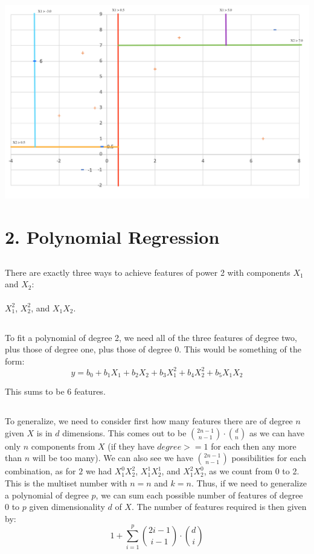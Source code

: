\documentclass[12pt, oneside]{article}   	%
\begin{document}
\includegraphics[scale=0.8]{decisionboundaryplot2}

\section{2. Polynomial Regression}

\subsection{}
There are exactly three ways to achieve features of power 2 with components $X_1$ and $X_2$: \\ \\
$X_1^2$, $X_2^2$, and $X_1X_2$. 

\subsection{}
To fit a polynomial of degree 2, we need all of the three features of degree two, plus those of degree one, plus those of degree 0. This would be something of the form: 
$$y = b_0 + b_1X_1 + b_2X_2 + b_3X_1^2 + b_4X_2^2 + b_5X_1X_2$$

This sums to be 6 features. 

\subsection{}

To generalize, we need to consider first how many features there are of degree $n$ given $X$ is in $d$ dimensions. This comes out to be $\binom{2n-1}{n-1} \cdot \binom{d}{n}$ as we can have only $n$ components from $X$ (if they have $degree >=1$ for each then any more than $n$ will be too many). We can also see we have $\binom{2n-1}{n-1}$ possibilities for each combination, as for $2$ we had $X_1^0X_2^2$, $X_1^1X_2^1$, and $X_1^2X_2^0$, as we count from 0 to 2. This is the multiset number with $n = n$ and $k = n$. Thus, if we need to generalize a polynomial of degree $p$, we can sum each possible number of features of degree 0 to $p$ given dimensionality $d$ of $X$. The number of features required is then given by:
$$ 1 + \sum_{i=1}^{p}{ \binom{2i-1}{i-1} \cdot \binom{d}{i}}$$
\end{document}
